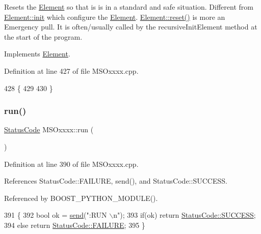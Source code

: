 Resets the \hyperlink{classElement}{Element} so that is is in a standard and safe situation. Different from \hyperlink{classElement_af42754b5cabc198869222725218d695c}{Element\+::init} which configure the \hyperlink{classElement}{Element}. \hyperlink{classElement_a69efffa22f06909d768149715565cb56}{Element\+::reset()} is more an Emergency pull. It is often/usually called by the recursive\+Init\+Element method at the start of the program. 

Implements \hyperlink{classElement_a69efffa22f06909d768149715565cb56}{Element}.



Definition at line 427 of file M\+S\+Oxxxx.\+cpp.


\begin{DoxyCode}
428 \{
429 
430 \}
\end{DoxyCode}
\mbox{\label{classMSOxxxx_a96ca34744e5a6b611aaf9ae7910f00cd}} 
\subsubsection{\texorpdfstring{run()}{run()}}
{\footnotesize\ttfamily \hyperlink{classStatusCode}{Status\+Code} M\+S\+Oxxxx\+::run (\begin{DoxyParamCaption}{ }\end{DoxyParamCaption})}



Definition at line 390 of file M\+S\+Oxxxx.\+cpp.



References Status\+Code\+::\+F\+A\+I\+L\+U\+RE, send(), and Status\+Code\+::\+S\+U\+C\+C\+E\+SS.



Referenced by B\+O\+O\+S\+T\+\_\+\+P\+Y\+T\+H\+O\+N\+\_\+\+M\+O\+D\+U\+L\+E().


\begin{DoxyCode}
391 \{
392     \textcolor{keywordtype}{bool} ok = \hyperlink{classMSOxxxx_ae77668a1ae4ccb74e0ed5f2485dfdebf}{send}(\textcolor{stringliteral}{":RUN \(\backslash\)n"});
393     \textcolor{keywordflow}{if}(ok)  \textcolor{keywordflow}{return} \hyperlink{classStatusCode_a6f565cbeadc76d14c72f047e5e85eb4badd0da38d3ba0d922efd1f4619bc37ad8}{StatusCode::SUCCESS};
394     \textcolor{keywordflow}{else}        \textcolor{keywordflow}{return} \hyperlink{classStatusCode_a6f565cbeadc76d14c72f047e5e85eb4ba3da73d4c469762eb9d3c960368252b26}{StatusCode::FAILURE};
395 \}
\end{DoxyCode}
\mbox{\label{classMSOxxxx_ae77668a1ae4ccb74e0ed5f2485dfdebf}} 
